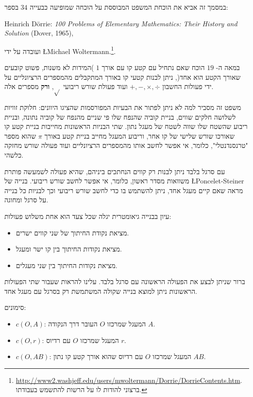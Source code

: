 \documentclass[12pt,a4paper]{article}
\begin{document}
במסמך זה אביא את הוכחת המשפט המבוססת על הוכחה שמופיעה כבעייה
$34$
בספר:

Heinrich D\"{o}rrie: \textit{100 Problems of Elementary Mathematics: Their History and Solution} (Dover, 1965),

ועובדה על ידי
\L{Michael Woltermann}.\footnote{\url{http://www2.washjeff.edu/users/mwoltermann/Dorrie/DorrieContents.htm}.
ברצוני להודות לו על הרשות להתשמש בעבודתו.
}.



במאה ה-
$19$
הוכח שאם נתחיל עם קטע קו עם אורך 
$1$
)המידות לא משנות, פשוט קובעים שאורך הקטע הוא אחד(, ניתן לבנות קטעי קו באורך המתקבלים מהמספרים הרציונליים על ידי פעולות החשבון 
$+,-,\times,\div$
ועוד פעולת שורש ריבועי 
$\sqrt{}$,
\textbf{%
ורק%
}
מספרים אלה.

משפט זה מסביר למה לא ניתן לפתור את הבעיות המפורסמות שהציגו היוונים: חלוקת זוויות לשלושה חלקים שווים, בניית קוביה שהנפח שלו פי שניים מהנפח של קוביה נתונה, ובניית ריבוע שהשטח שלו שווה לשטח של מעגל נתון. שתי הבניות הראשונות מחייבות בניית קטע קו שאורכו שורש שלישי של קו אחר, וריבוע המעגל מחייב בניית קטע באורך
$\pi$
שהוא מספר "טרנסנדנטלי", כלומר, אי אפשר לחשב אותו מהמספרים הרציונליים ועוד פעולה שורש מחזקה כלשהי.

עם סרגל בלבד ניתן לבנות רק קווים הנחתכים ביניהם, שהיא פעולה לשמעשה פותרת משוואות מסדר ראשון, כלומר, אי אפשר לחשב שורש ריבועי. בנייה של
\L{Poncelet-Steiner}
מראה שאם קיים מעגל אחד, ניתן להשתמש בו כדי לחשב שורש ריבועי וכך לבניות כל בנייה על סרגל ומחוגה.


עיון בבנייה גיאומטרית יגלה שכל צעד הוא אחת משלוש פעולות:
\begin{itemize}
\item
מציאת נקודת החיתוך של שני קווים ישרים.
\item
מציאת נקודות החיתוך בין קו ישר ומעגל.
\item
מציאת נקודות החיתוך בין שני מעגלים.
\end{itemize}
ברור שניתן לבצע את הפעולה הראשונה עם סרגל בלבד. עלינו להראות שעבור שתי הפעולות הראשונות ניתן למוצא בנייה שקולה המשתמשת רק בסרגל עם מעגל אחד.


סימונים:
\begin{itemize}
\item $c(O,A)$: 
המעגל שמרכזו
$O$
העובר דרך הנקודה
$A$.
\item $c(O,r)$:
המעגל שמרכזו
$O$
עם רדיוס
$r$.
\item $c(O,AB)$:
המעגל שמרכזו
$O$
עם רדיוס שהוא אורך קטע קו נתון
$AB$.
\end{itemize}
\end{document}
